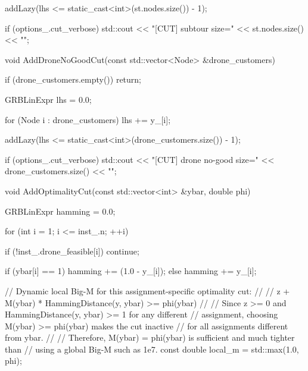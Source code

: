 {{{{{                    addLazy(lhs <= static_cast<int>(st.nodes.size()) - 1);

                    if (options_.cut_verbose)
                    {
                        std::cout << "[CUT] subtour size=" << st.nodes.size() << "\n";
                    }
                }

                void AddDroneNoGoodCut(const std::vector<Node> &drone_customers)
                {
                    if (drone_customers.empty())
                        return;

                    GRBLinExpr lhs = 0.0;

                    for (Node i : drone_customers)
                    {
                        lhs += y_[i];
                    }

                    addLazy(lhs <= static_cast<int>(drone_customers.size()) - 1);

                    if (options_.cut_verbose)
                    {
                        std::cout << "[CUT] drone no-good size=" << drone_customers.size() << "\n";
                    }
                }

                void AddOptimalityCut(const std::vector<int> &ybar, double phi)
                {
                    GRBLinExpr hamming = 0.0;

                    for (int i = 1; i <= inst_.n; ++i)
                    {
                        if (!inst_.drone_feasible[i])
                            continue;

                        if (ybar[i] == 1)
                        {
                            hamming += (1.0 - y_[i]);
                        }
                        else
                        {
                            hamming += y_[i];
                        }
                    }

                    // Dynamic local Big-M for this assignment-specific optimality cut:
                    //
                    //     z + M(ybar) * HammingDistance(y, ybar) >= phi(ybar)
                    //
                    // Since z >= 0 and HammingDistance(y, ybar) >= 1 for any different
                    // assignment, choosing M(ybar) >= phi(ybar) makes the cut inactive
                    // for all assignments different from ybar.
                    //
                    // Therefore, M(ybar) = phi(ybar) is sufficient and much tighter than
                    // using a global Big-M such as 1e7.
                    const double local_m = std::max(1.0, phi);

}}}}}
